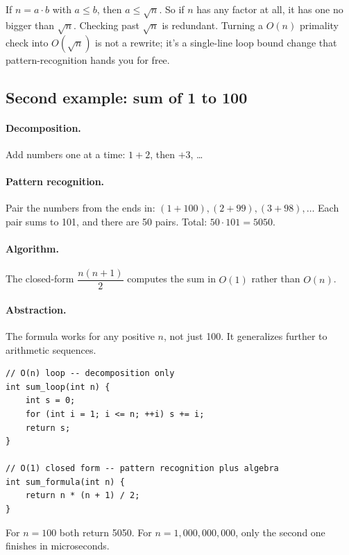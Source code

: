 \documentclass[11pt]{article}
\begin{document}
\begin{notebox}
If $n = a \cdot b$ with $a \le b$, then $a \le \sqrt{n}$. So if $n$
has any factor at all, it has one no bigger than $\sqrt{n}$. Checking
past $\sqrt{n}$ is redundant. Turning a $O(n)$ primality check into
$O(\sqrt{n})$ is not a rewrite; it's a single-line loop bound change
that pattern-recognition hands you for free.
\end{notebox}

\subsection{Second example: sum of 1 to 100}

\paragraph{Decomposition.} Add numbers one at a time:
$1 + 2$, then $+ 3$, \ldots

\paragraph{Pattern recognition.} Pair the numbers from the ends in:
$(1 + 100), (2 + 99), (3 + 98), \ldots$ Each pair sums to 101, and
there are 50 pairs. Total: $50 \cdot 101 = 5050$.

\paragraph{Algorithm.} The closed-form $\dfrac{n(n+1)}{2}$ computes
the sum in $O(1)$ rather than $O(n)$.

\paragraph{Abstraction.} The formula works for any positive $n$, not
just 100. It generalizes further to arithmetic sequences.

\begin{examplebox}
\begin{verbatim}
// O(n) loop -- decomposition only
int sum_loop(int n) {
    int s = 0;
    for (int i = 1; i <= n; ++i) s += i;
    return s;
}

// O(1) closed form -- pattern recognition plus algebra
int sum_formula(int n) {
    return n * (n + 1) / 2;
}
\end{verbatim}
For $n = 100$ both return 5050. For $n = 1{,}000{,}000{,}000$, only
the second one finishes in microseconds.
\end{examplebox}
\end{document}
